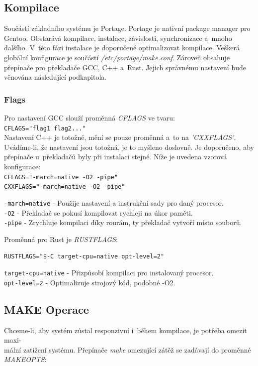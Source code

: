 \documentclass[12pt,a4paper,twoside,]{article}
\begin{document}
{{{{{{{\newpage
\subsection{\textsf{Kompilace}}
Součástí základního systému je Portage. Portage je nativní package manager pro Gentoo.
Obstarává kompilace, instalace, závislosti, synchronizace a~mnoho dalšího. V~této fázi instalace
je doporučené optimalizovat kompilace. Veškerá globální konfigurace je součástí \textit{/etc/portage/make.conf}.
Zároveň obsahuje přepínače pro překladače GCC, C++ a~Rust. Jejich správnému nastavení bude věnována následující podkapitola.

\subsubsection{\textsf{Flags}}
Pro nastavení GCC slouží proměnná \textit{CFLAGS} ve tvaru:\\ \hspace*{1.5em}\texttt{CFLAGS="flag1 flag2..."}\\Nastavení C++ je totožné, mění se pouze proměnná a~to na \textit{'CXXFLAGS'}.
Uvádíme-li, že nastavení jsou totožná, je to myšleno doslovně. Je doporučeno, aby přepínače u~překladačů byly při instalaci stejné. Níže je uvedena
vzorová konfigurace:\\
\hspace*{1.5em}\texttt{CFLAGS="-march=native -O2 -pipe"}\\
\hspace*{1.5em}\texttt{CXXFLAGS="-march=native -O2 -pipe"}

\hspace{-1.5em}\texttt{-march=native} - Použije nastavení a instrukční sady pro daný procesor.\\
\texttt{-O2} - Překladač se pokusí kompilovat rychleji na úkor paměti.\\
\texttt{-pipe} - Zrychluje kompilaci díky rourám, ty překladač vytvoří místo souborů.

\hspace{-1.5em}Proměnná pro Rust je \textit{RUSTFLAGS}:

\texttt{RUSTFLAGS="\$-C target-cpu=native opt-level=2"}

\hspace{-1.5em}\texttt{target-cpu=native} - Přizpůsobí kompilaci pro instalovaný procesor.\\
\texttt{opt-level=2} - Optimalizuje strojový kód, podobné -O2. %
\subsection{\textsf{MAKE Operace}}
Chceme-li, aby systém zůstal responzivní i~během kompilace, je potřeba omezit maxi-\\mální zatížení systému.
Přepínače \textit{make} omezující zátěž se zadávají do proměnné \textit{MAKEOPTS}:

}}}}}}}
\end{document}
